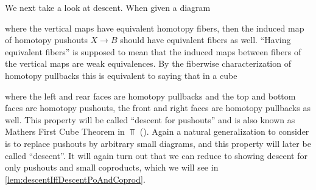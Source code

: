We next take a look at descent.
When given a diagram 
\begin{center}
\end{center}
where the vertical maps have equivalent homotopy fibers, then the induced map of homotopy pushouts $X\to B$ should have equivalent fibers as well.
``Having equivalent fibers'' is supposed to mean that the induced maps between fibers of the vertical maps are weak equivalences.
By the fiberwise characterization of homotopy pullbacks this is equivalent to saying that in a cube 
\begin{center}
\end{center}
where the left and rear faces are homotopy pullbacks and the top and bottom faces are homotopy pushouts, the front and right faces are homotopy pullbacks as well.
This property will be called ``descent for pushouts'' and is also known as Mathers First Cube Theorem in $\Top$ (\cite[Theorem 18]{mather_1976}).
Again a natural generalization to consider is to replace pushouts by arbitrary small diagrams, and this property will later be called ``descent''.
It will again turn out that we can reduce to showing descent for only pushouts and small coproducts, which we will see in \cref{lem:descentIffDescentPoAndCoprod}.